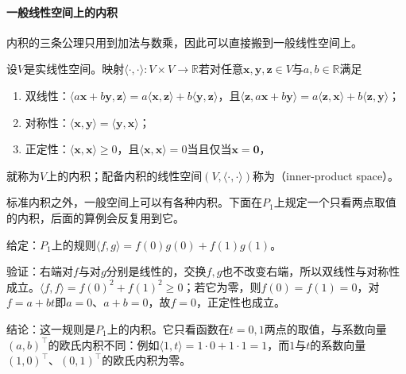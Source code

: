 \paragraph{一般线性空间上的内积}
内积的三条公理只用到加法与数乘，因此可以直接搬到一般线性空间上。
\begin{definition}[内积空间]
\label{def:functional-inner-product-space}
设$V$是实线性空间。映射$\langle\cdot,\cdot\rangle:V\times V\to\mathbb R$若对任意$\bm x,\bm y,\bm z\in V$与$a,b\in\mathbb R$满足
\begin{enumerate}
 \item 双线性：$\langle a\bm x+b\bm y,\bm z\rangle=a\langle\bm x,\bm z\rangle+b\langle\bm y,\bm z\rangle$，且$\langle\bm z,a\bm x+b\bm y\rangle=a\langle\bm z,\bm x\rangle+b\langle\bm z,\bm y\rangle$；
 \item 对称性：$\langle\bm x,\bm y\rangle=\langle\bm y,\bm x\rangle$；
 \item 正定性：$\langle\bm x,\bm x\rangle\geq0$，且$\langle\bm x,\bm x\rangle=0$当且仅当$\bm x=\bm0$，
\end{enumerate}
就称为$V$上的内积；配备内积的线性空间$(V,\langle\cdot,\cdot\rangle)$称为（inner-product space）。
\end{definition}
标准内积之外，一般空间上可以有各种内积。下面在$P_1$上规定一个只看两点取值的内积，后面的算例会反复用到它。
\begin{example}[只看两点取值的内积]
\label{ex:ls-two-point-inner-product}
给定：$P_1$上的规则$\langle f,g\rangle=f(0)g(0)+f(1)g(1)$。

验证：右端对$f$与对$g$分别是线性的，交换$f,g$也不改变右端，所以双线性与对称性成立。$\langle f,f\rangle=f(0)^2+f(1)^2\geq0$；若它为零，则$f(0)=f(1)=0$，对$f=a+bt$即$a=0$、$a+b=0$，故$f=0$，正定性也成立。

结论：这一规则是$P_1$上的内积。它只看函数在$t=0,1$两点的取值，与系数向量$(a,b)^\top$的欧氏内积不同：例如$\langle1,t\rangle=1\cdot0+1\cdot1=1$，而$1$与$t$的系数向量$(1,0)^\top$、$(0,1)^\top$的欧氏内积为零。
\end{example}

